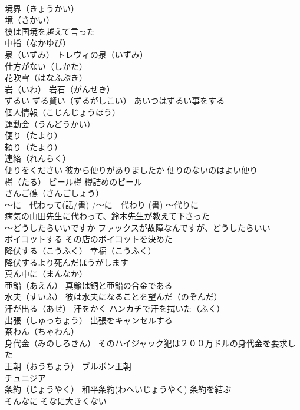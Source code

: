 \documentclass[8pt]{extreport}
\begin{document}
\begin{CJK}{UTF8}{min}
\\	境界（きょうかい）
\\	境（さかい）
\\	彼は国境を越えて言った
\\	中指（なかゆび）
\\	泉（いずみ） トレヴィの泉（いずみ）
\\	仕方がない（しかた）
\\	花吹雪（はなふぶき）
\\	岩（いわ） 岩石（がんせき）
\\	ずるい ずる賢い（ずるがしこい） あいつはずるい事をする
\\	個人情報（こじんじょうほう）
\\	運動会（うんどうかい）
\\	便り（たより）
\\	頼り（たより）
\\	連絡（れんらく）
\\	便りをください 彼から便りがありましたか 便りのないのはよい便り
\\	樽（たる） ビール樽 樽詰めのビール
\\	さんご礁（さんごしょう）
\\	～に　代わって(話/書) /～に　代わり (書) ～代りに 
\\	病気の山田先生に代わって、鈴木先生が教えて下さった
\\	～どうしたらいいですか ファックスが故障なんですが、どうしたらいい
\\	ボイコットする その店のボイコットを決めた
\\	降伏する（こうふく） 幸福（こうふく） 
\\	降伏するより死んだほうがします
\\	真ん中に（まんなか）
\\	亜鉛（あえん） 真鍮は銅と亜鉛の合金である
\\	水夫（すいふ） 彼は水夫になることを望んだ（のぞんだ）
\\	汗が出る（あせ） 汗をかく ハンカチで汗を拭いた（ふく）
\\	出張（しゅっちょう） 出張をキャンセルする
\\	茶わん（ちゃわん）
\\	身代金（みのしろきん） そのハイジャック犯は２００万ドルの身代金を要求した
\\	王朝（おうちょう） ブルボン王朝
\\	チュニジア
\\	条約（じょうやく） 和平条約(わへいじょうやく) 条約を結ぶ
\\	そんなに そなに大きくない

\end{CJK}
\end{document}
